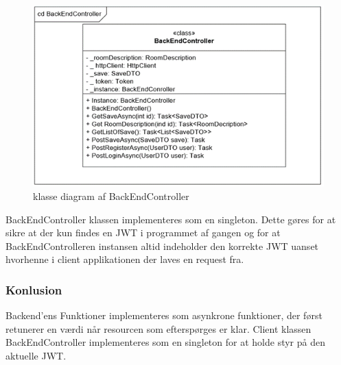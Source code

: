 \begin{figure}[H]
\centering
\includegraphics[width = \textwidth]{02-Body/Images/Backend_klasse_BackEndController.PNG}
\caption{klasse diagram af BackEndController}
\label{fig:Implementering-Backend-Klasse-BackEndController}
\end{figure}

BackEndController klassen implementeres som en singleton. Dette gøres for at sikre at der kun findes en JWT i programmet af gangen og for at BackEndControlleren instansen altid indeholder den korrekte JWT uanset hvorhenne i client applikationen der laves en request fra.\\


\subsubsection{Konlusion}

Backend'ens Funktioner implementeres som asynkrone funktioner, der først retunerer en værdi når resourcen som efterspørges er klar. Client klassen BackEndController implementeres som en singleton for at holde styr på den aktuelle JWT.

\newpage
